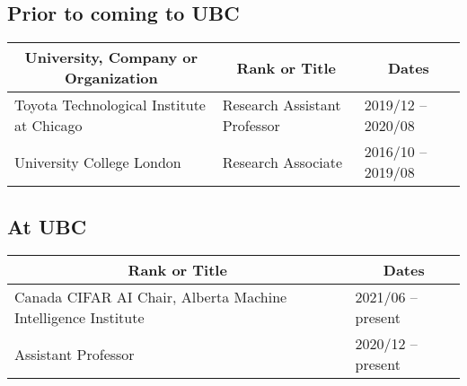 \documentclass[10pt]{article}
\begin{document}
\subsection{Prior to coming to UBC}
\noindent\vspace{-2em}
\begin{table}[h!]
  \begin{tabular}{ p{} p{} p{} }
    \toprule
    \multicolumn{1}{c}{\bf University, Company or Organization} & \multicolumn{1}{c}{\bf Rank or Title} & \multicolumn{1}{c}{\bf Dates} \\
    \midrule
    Toyota Technological Institute at Chicago  & Research Assistant Professor  & 2019/12 -- 2020/08 \\
    University College London & Research Associate   & 2016/10 -- 2019/08  \\
    \bottomrule
  \end{tabular}
\end{table}


\vspace{-1em}
\subsection{At UBC}
\noindent\vspace{-2em}
\begin{table}[h!]
  \begin{tabular}{ p{} p{} }
    \toprule
    \multicolumn{1}{c}{\bf Rank or Title} & \multicolumn{1}{c}{\bf Dates} \\
    \midrule
    Canada CIFAR AI Chair, Alberta Machine Intelligence Institute & 2021/06 -- present \\
    Assistant Professor               & 2020/12 -- present        \\
    \bottomrule
  \end{tabular}
\end{table}
\end{document}
